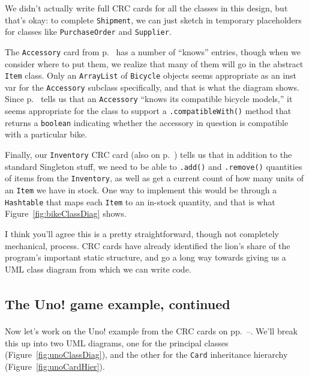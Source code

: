 We didn't actually write full CRC cards for all the classes in this design, but
that's okay: to complete \texttt{Shipment}, we can just sketch in temporary
placeholders for classes like \texttt{PurchaseOrder} and \texttt{Supplier}.

The \texttt{Accessory} card from p.~\pageref{bikeCRC2} has a number of
``knows'' entries, though when we consider where to put them, we realize that
many of them will go in the abstract \texttt{Item} class. Only an
\texttt{ArrayList} of \texttt{Bicycle} objects seems appropriate as an inst var
for the \texttt{Accessory} subclass specifically, and that is what the diagram
shows. Since p.~\pageref{bikeCRC2} tells us that an \texttt{Accessory} ``knows
its compatible bicycle models,'' it seems appropriate for the class to support
a \texttt{.compatibleWith()} method that returns a \texttt{boolean} indicating
whether the accessory in question is compatible with a particular bike.

Finally, our \texttt{Inventory} CRC card (also on p.~\pageref{bikeCRC2}) tells
us that in addition to the standard Singleton stuff, we need to be able to
\texttt{.add()} and \texttt{.remove()} quantities of items from the
\texttt{Inventory}, as well as get a current count of how many units of an
\texttt{Item} we have in stock. One way to implement this would be through a
\texttt{Hashtable} that maps each \texttt{Item} to an in-stock quantity, and
that is what Figure~\ref{fig:bikeClassDiag} shows.

I think you'll agree this is a pretty straightforward, though not completely
mechanical, process. CRC cards have already identified the lion's share of the
program's important static structure, and go a long way towards giving us a UML
class diagram from which we can write code.

\subsection{The Uno!\textsuperscript{\textregistered} game example, continued}

Now let's work on the Uno!\textsuperscript{\textregistered} example from the
CRC cards on pp.~\pageref{unoCRC1}--\pageref{unoCRC2}. We'll break this up into
two UML diagrams, one for the principal classes
(Figure~\ref{fig:unoClassDiag}), and the other for the \texttt{Card}
inheritance hierarchy (Figure~\ref{fig:unoCardHier}).

